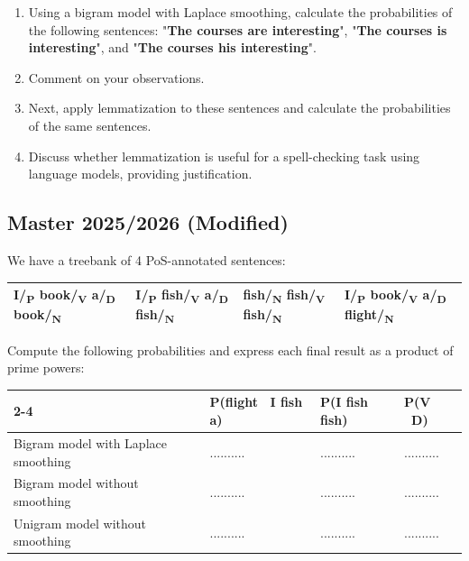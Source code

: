 \documentclass{../extra/aakpract/aakpract}
\begin{document}
	\begin{enumerate}
		\item Using a bigram model with Laplace smoothing, calculate the probabilities of the following sentences: "\textbf{The courses are interesting}", "\textbf{The courses is interesting}", and "\textbf{The courses his interesting}".
		\item Comment on your observations.
		\item Next, apply lemmatization to these sentences and calculate the probabilities of the same sentences.
		\item Discuss whether lemmatization is useful for a spell-checking task using language models, providing justification.
	\end{enumerate}
	
	
	\subsection{Master 2025/2026 (Modified)}
	
	We have a treebank of 4 PoS-annotated sentences: 
	\begin{center}
		\begin{tabular}{|l|l|l|l|}
			\hline
			I/\textsubscript{P} book/\textsubscript{V} a/\textsubscript{D} book/\textsubscript{N} &
			I/\textsubscript{P} fish/\textsubscript{V} a/\textsubscript{D} fish/\textsubscript{N} &
			fish/\textsubscript{N} fish/\textsubscript{V} fish/\textsubscript{N} &
			I/\textsubscript{P} book/\textsubscript{V} a/\textsubscript{D} flight/\textsubscript{N} \\
			\hline
		\end{tabular}
	\end{center}
	
	Compute the following probabilities and express each final result as a product of prime powers:
	\begin{center}
		\begin{tabular}{|p{}|p{}|p{}|p{}|}
			\cline{2-4}
			\multicolumn{1}{c|}{}& P(flight \textbar\  I fish a) & P(I fish fish) & P(V \textbar\ D) \\
			\hline
			Bigram model with Laplace smoothing & .......... & .......... & .......... \\
			\hline
			Bigram model without smoothing & .......... & .......... & .......... \\
			\hline
			Unigram model without smoothing & .......... & .......... & .......... \\
			\hline
		\end{tabular}
	\end{center}
	
\end{document}
